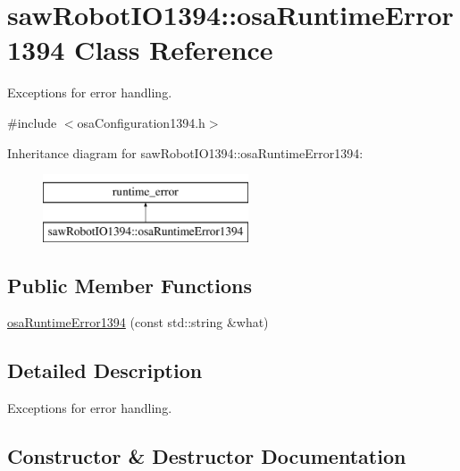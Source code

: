 \hypertarget{classsaw_robot_i_o1394_1_1osa_runtime_error1394}{}\section{saw\+Robot\+I\+O1394\+:\+:osa\+Runtime\+Error1394 Class Reference}
\label{classsaw_robot_i_o1394_1_1osa_runtime_error1394}


Exceptions for error handling.  




{\ttfamily \#include $<$osa\+Configuration1394.\+h$>$}

Inheritance diagram for saw\+Robot\+I\+O1394\+:\+:osa\+Runtime\+Error1394\+:\begin{figure}[H]
\begin{center}
\leavevmode
\includegraphics[height=2.000000cm]{d8/da1/classsaw_robot_i_o1394_1_1osa_runtime_error1394}
\end{center}
\end{figure}
\subsection*{Public Member Functions}
\begin{DoxyCompactItemize}
\item 
\hyperlink{classsaw_robot_i_o1394_1_1osa_runtime_error1394_a41ff359fbdfea2232d37a48560e98a5c}{osa\+Runtime\+Error1394} (const std\+::string \&what)
\end{DoxyCompactItemize}


\subsection{Detailed Description}
Exceptions for error handling. 

\subsection{Constructor \& Destructor Documentation}
\hypertarget{classsaw_robot_i_o1394_1_1osa_runtime_error1394_a41ff359fbdfea2232d37a48560e98a5c}{}
